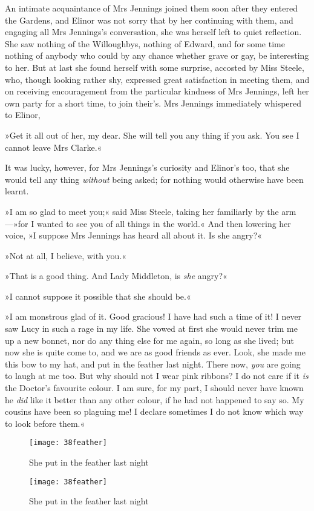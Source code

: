 An intimate acquaintance of Mrs Jennings joined them soon after they entered the Gardens, and Elinor was not sorry that by her continuing with them, and engaging all Mrs Jennings’s conversation, she was herself left to quiet reflection. She saw nothing of the Willoughbys, nothing of Edward, and for some time nothing of anybody who could by any chance whether grave or gay, be interesting to her. But at last she found herself with some surprise, accosted by Miss Steele, who, though looking rather shy, expressed great satisfaction in meeting them, and on receiving encouragement from the particular kindness of Mrs Jennings, left her own party for a short time, to join their’s. Mrs Jennings immediately whispered to Elinor,

»Get it all out of her, my dear. She will tell you any thing if you ask. You see I cannot leave Mrs Clarke.«

It was lucky, however, for Mrs Jennings’s curiosity and Elinor’s too, that she would tell any thing \textit{without} being asked; for nothing would otherwise have been learnt.

»I am so glad to meet you;« said Miss Steele, taking her familiarly by the arm—»for I wanted to see you of all things in the world.« And then lowering her voice, »I suppose Mrs Jennings has heard all about it. Is she angry?«

»Not at all, I believe, with you.«

»That is a good thing. And Lady Middleton, is \textit{she} angry?«

»I cannot suppose it possible that she should be.«

»I am monstrous glad of it. Good gracious! I have had such a time of it! I never saw Lucy in such a rage in my life. She vowed at first she would never trim me up a new bonnet, nor do any thing else for me again, so long as she lived; but now she is quite come to, and we are as good friends as ever. Look, she made me this bow to my hat, and put in the feather last night. There now, \textit{you} are going to laugh at me too. But why should not I wear pink ribbons? I do not care if it \textit{is} the Doctor’s favourite colour. I am sure, for my part, I should never have known he \textit{did} like it better than any other colour, if he had not happened to say so. My cousins have been so plaguing me! I declare sometimes I do not know which way to look before them.«



\makeatletter
{}
{%
\begin{figure}[tbph]
	\centering
\texttt{[image: 38feather]}
\caption{She put in the feather last night}
\end{figure}
}{%
\begin{figure}[tbph]
\centering
\texttt{[image: 38feather]}
\caption{She put in the feather last night}
\end{figure}
}
\makeatother


